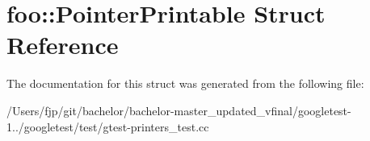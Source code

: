 \hypertarget{structfoo_1_1_pointer_printable}{}\section{foo\+:\+:Pointer\+Printable Struct Reference}
\label{structfoo_1_1_pointer_printable}


The documentation for this struct was generated from the following file\+:\begin{DoxyCompactItemize}
\item 
/\+Users/fjp/git/bachelor/bachelor-\/master\+\_\+updated\+\_\+vfinal/googletest-\/1../googletest/test/gtest-\/printers\+\_\+test.\+cc\end{DoxyCompactItemize}
